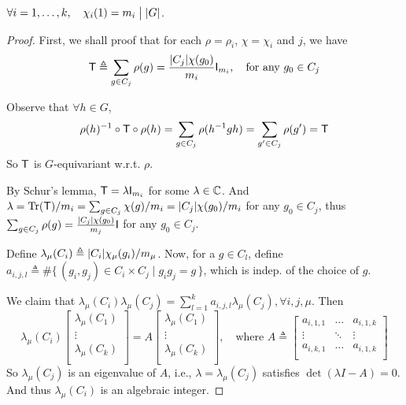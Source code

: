 \begin{theorem}[Divisibility]
  $\forall i = 1, \dots, k, \quad \chi_i(1) = m_i \mathrel{\big|} \lvert G\rvert$.

  \begin{proof} \mbox{}
    First, we shall proof that for each $\rho=\rho_i$, $\chi = \chi_i$ and $j$, we have
    \[
      {\sf T} \triangleq \sum_{g\in C_j} \rho(g) = \frac{\lvert C_j\rvert\chi(g_0)}{m_i}
      {\sf I}_{m_i}, \quad \text{for any } g_0 \in C_j
    \]

    Observe that $\forall h \in G$,
    \[
      \rho(h)^{-1}\circ{\sf T}\circ\rho(h) = \sum_{g\in C_j} \rho(h^{-1}gh)
      = \sum_{g'\in C_j} \rho(g') = {\sf T}
    \]
    So ${\sf T}$ is $G$-equivariant w.r.t. $\rho$.

    By Schur's lemma, ${\sf T} = \lambda {\sf I}_{m_i}$ for some $\lambda \in \mathbb{C}$.
    And $\lambda = \operatorname{Tr}({\sf T}) / m_i = \sum_{g\in C_j} \chi(g) / m_i = \lvert C_j\rvert\chi(g_0) / m_i$
    for any $g_0 \in C_j$, thus $\sum_{g \in C_j} \rho(g) = \frac{\lvert C_j\rvert\chi(g_0)}{m_j} {\sf I}$
    for any $g_0 \in C_j$.
    
    Define $\lambda_\mu(C_i) \triangleq \lvert C_i\rvert\chi_\mu(g_i) / m_\mu$.
    Now, for a $g \in C_l$, define $a_{i,j,l} \triangleq \# \{\, (g_i, g_j) \in C_i \times C_j \mid
    g_ig_j = g \,\}$, which is indep. of the choice of $g$.

    We claim that $\lambda_\mu(C_i)\lambda_\mu(C_j) = \sum_{l=1}^k a_{i,j,l} \lambda_\mu(C_j)
    ,\forall i, j, \mu$. Then 
    \[ \lambda_\mu(C_i) 
      \begin{bmatrix}
        \lambda_\mu(C_1) \\
        \vdots \\
        \lambda_\mu(C_k) \\
      \end{bmatrix}
      = A
      \begin{bmatrix}
        \lambda_\mu(C_1) \\
        \vdots \\
        \lambda_\mu(C_k) \\
      \end{bmatrix}, \quad
      \text{where } A \triangleq
      \begin{bmatrix}
        a_{i, 1, 1} & \hdots & a_{i, 1, k} \\
        \vdots & \ddots & \vdots \\
        a_{i, k, 1} & \hdots & a_{i, 1, k} \\
      \end{bmatrix}
    \]
    So $\lambda_\mu(C_j)$ is an eigenvalue of
    $A$, i.e., $\lambda = \lambda_\mu(C_j)$ satisfies $\det(\lambda I - A) = 0$.
    And thus $\lambda_\mu(C_i)$ is an algebraic integer.


\end{proof}
\end{theorem}
